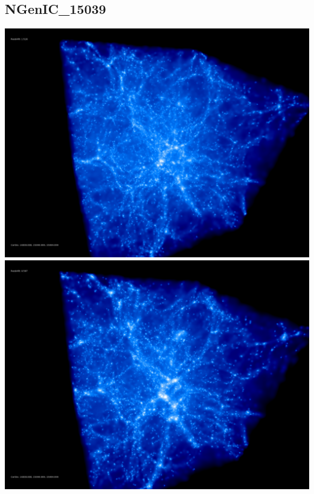 % 
%
%
%
%
%
%
%


\newpage
\subsection{NGenIC\_15039}

\includegraphics[scale=0.1]{r256/NGenIC_15039/50.jpg} 
\includegraphics[scale=0.1]{r256/NGenIC_15039/100.jpg}  \\

